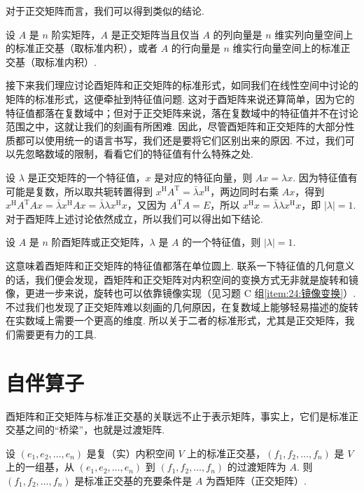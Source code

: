 对于正交矩阵而言，我们可以得到类似的结论.

\begin{theorem}{}{}
    设 $ A $ 是 $ n $ 阶实矩阵，$ A $ 是正交矩阵当且仅当 $ A $ 的列向量是 $ n $ 维实列向量空间上的标准正交基（取标准内积），或者 $ A $ 的行向量是 $ n $ 维实行向量空间上的标准正交基（取标准内积）.
\end{theorem}

接下来我们理应讨论酉矩阵和正交矩阵的标准形式，如同我们在线性空间中讨论的矩阵的标准形式，这便牵扯到特征值问题. 这对于酉矩阵来说还算简单，因为它的特征值都落在复数域中；但对于正交矩阵来说，落在复数域中的特征值并不在讨论范围之中，这就让我们的刻画有所困难. 因此，尽管酉矩阵和正交矩阵的大部分性质都可以使用统一的语言书写，我们还是要将它们区别出来的原因. 不过，我们可以先忽略数域的限制，看看它们的特征值有什么特殊之处.

设 $ \lambda $ 是正交矩阵的一个特征值，$ x $ 是对应的特征向量，则 $ Ax = \lambda x $. 因为特征值有可能是复数，所以取共轭转置得到 $ x^{\mathrm{H}}A^{\mathrm{T}} = \bar{\lambda} x^{\mathrm{H}} $，两边同时右乘 $ Ax $，得到 $ x^{\mathrm{H}}A^{\mathrm{T}}Ax = \bar{\lambda} x^{\mathrm{H}}Ax = \bar{\lambda} \lambda x^{\mathrm{H}}x $，又因为 $ A^{\mathrm{T}}A = E $，所以 $ x^{\mathrm{H}}x = \bar{\lambda} \lambda x^{\mathrm{H}}x $，即 $ \lvert \lambda \rvert = 1 $. 对于酉矩阵上述讨论依然成立，所以我们可以得出如下结论.

\begin{theorem}{}{}
    设 $ A $ 是 $ n $ 阶酉矩阵或正交矩阵，$ \lambda $ 是 $ A $ 的一个特征值，则 $ \lvert \lambda \rvert = 1 $.
\end{theorem}

这意味着酉矩阵和正交矩阵的特征值都落在单位圆上. 联系一下特征值的几何意义的话，我们便会发现，酉矩阵和正交矩阵对内积空间的变换方式无非就是旋转和镜像，更进一步来说，旋转也可以依靠镜像实现（见习题 C 组\ref*{item:24:镜像变换}）. 不过我们也发现了正交矩阵难以刻画的几何原因，在复数域上能够轻易描述的旋转在实数域上需要一个更高的维度. 所以关于二者的标准形式，尤其是正交矩阵，我们需要更有力的工具.

\section{自伴算子}

酉矩阵和正交矩阵与标准正交基的关联远不止于表示矩阵，事实上，它们是标准正交基之间的“桥梁”，也就是过渡矩阵.

\begin{theorem}{}{}
    设 $ (e_1, e_2, \ldots , e_n) $ 是复（实）内积空间 $ V $ 上的标准正交基，$ (f_1, f_2, \ldots , f_n) $ 是 $ V $ 上的一组基，从 $ (e_1, e_2, \ldots , e_n) $ 到 $ (f_1, f_2, \ldots , f_n) $ 的过渡矩阵为 $ A $. 则 $ (f_1, f_2, \ldots , f_n) $ 是标准正交基的充要条件是 $ A $ 为酉矩阵（正交矩阵）.
\end{theorem}


